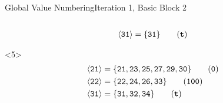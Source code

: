 \documentclass{beamer}
\newcommand{\vn}[1]{\ensuremath{\langle\texttt{#1}\rangle}}
\newcommand{\vreg}[1]{\texttt{#1}}
\begin{document}
\begin{frame}[fragile]{Global Value Numbering}{Iteration 1, Basic Block 2}
\begin{columns}[t,onlytextwidth]
\begin{column}{.5\textwidth}
\begin{onlyenv}
\begin{align*}
          \vn{31} &= \{\vreg{31}\}                                  \tag{\texttt{\textbf{t}}} \\
        \end{align*}
      \end{onlyenv}
      \begin{onlyenv}<5>
        \begin{align*}
          \vn{21} &= \{\vreg{21},
                       \vreg{23},
                       \vreg{25},
                       \vreg{27},
                       \vreg{29},
                       \vreg{30}\} \tag{\texttt{0}} \\
          \vn{22} &= \{\vreg{22},
                       \vreg{24},
                       \vreg{26},
                       \vreg{33}\} \tag{\texttt{100}} \\
          \vn{31} &= \{\vreg{31},
                       \vreg{32},
                       \vreg{34}\} \tag{\texttt{\textbf{t}}}
        \end{align*}
      \end{onlyenv}
    \end{column}
  \end{columns}
\end{frame}
\end{document}
